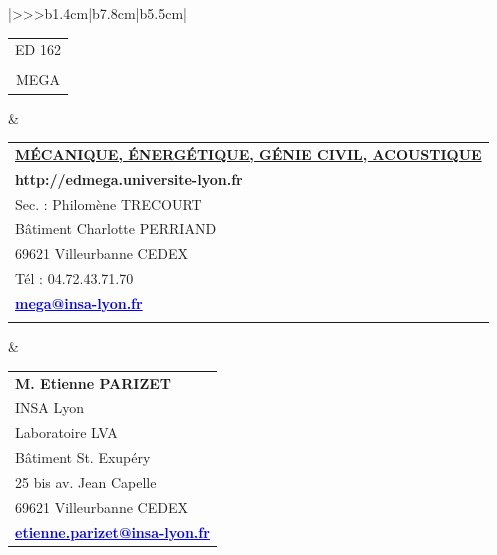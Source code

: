 \begin{center}
\begin{tabular}{|>{\centering}>{}>{\color{txtED}}b{1.4cm}|b{7.8cm}|b{5.5cm}|}
\hline	
	\begin{tabular}{@{}c@{}}
		ED 162\\
		\\
		MEGA\end{tabular}&
	\begin{tabular}{@{}l@{}}
		\\
		\textbf{\underline{MÉCANIQUE, ÉNERGÉTIQUE, GÉNIE CIVIL, ACOUSTIQUE}}\\[.2cm]
		\textcolor{siteED}{\textbf{http://edmega.universite-lyon.fr}}\\
		Sec. : Philomène TRECOURT\\
		Bâtiment Charlotte PERRIAND\\
		69621 Villeurbanne CEDEX\\
		Tél : 04.72.43.71.70\\
		\textcolor{blue}{\underline{\textbf{mega@insa-lyon.fr}}}\\
		\\
	\end{tabular}&
	\begin{tabular}{@{}l@{}}
		\textcolor{txtED}{\textbf{M. Etienne PARIZET}}\\
		INSA Lyon\\
		Laboratoire LVA\\
		Bâtiment St. Exupéry\\
		25 bis av. Jean Capelle\\
		69621 Villeurbanne CEDEX\\ 
		\textcolor{blue}{\underline{\textbf{etienne.parizet@insa-lyon.fr}}}\\
	\end{tabular}\\
		

\end{tabular}
\end{center}
